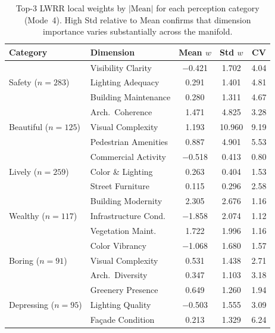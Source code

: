 \documentclass[runningheads]{llncs}
\begin{document}
\begin{table}[H]
\centering
\caption{Top-3 LWRR local weights by $|\text{Mean}|$ for each perception category (Mode~4). High Std relative to Mean confirms that dimension importance varies substantially across the manifold.}
\label{tab:weight_variation_all}
\small
\setlength{\tabcolsep}{4pt}
\begin{tabular}{llccc}
\toprule
Category & Dimension & Mean $w$ & Std $w$ & CV \\
\midrule
\multirow{3}{*}{Safety ($n{=}283$)}
& Visibility Clarity      & $-$0.421 & 1.702 & 4.04 \\
& Lighting Adequacy        & 0.291  & 1.401 & 4.81 \\
& Building Maintenance     & 0.280  & 1.311 & 4.67 \\
\midrule
\multirow{3}{*}{Beautiful ($n{=}125$)}
& Arch.\ Coherence         & 1.471  & 4.825 & 3.28 \\
& Visual Complexity        & 1.193  & 10.960 & 9.19 \\
& Pedestrian Amenities     & 0.887  & 4.901 & 5.53 \\
\midrule
\multirow{3}{*}{Lively ($n{=}259$)}
& Commercial Activity      & $-$0.518 & 0.413 & 0.80 \\
& Color \& Lighting        & 0.263  & 0.404 & 1.53 \\
& Street Furniture         & 0.115  & 0.296 & 2.58 \\
\midrule
\multirow{3}{*}{Wealthy ($n{=}117$)}
& Building Modernity       & 2.305  & 2.676 & 1.16 \\
& Infrastructure Cond.     & $-$1.858 & 2.074 & 1.12 \\
& Vegetation Maint.        & 1.722  & 1.996 & 1.16 \\
\midrule
\multirow{3}{*}{Boring ($n{=}91$)}
& Color Vibrancy           & $-$1.068 & 1.680 & 1.57 \\
& Visual Complexity        & 0.531  & 1.438 & 2.71 \\
& Arch.\ Diversity         & 0.347  & 1.103 & 3.18 \\
\midrule
\multirow{3}{*}{Depressing ($n{=}95$)}
& Greenery Presence        & 0.649  & 1.260 & 1.94 \\
& Lighting Quality         & $-$0.503 & 1.555 & 3.09 \\
& Fa\c{c}ade Condition     & 0.213  & 1.329 & 6.24 \\
\bottomrule
\end{tabular}
\end{table}
\end{document}
